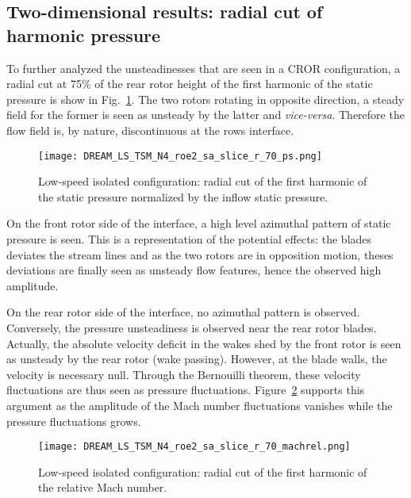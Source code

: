 \subsection{Two-dimensional results: radial cut of harmonic pressure}
\label{sub:dream_ls_hb_radial_cuts}

To further analyzed the unsteadinesses that are seen
in a CROR configuration, a radial cut at 75\% of the
rear rotor height of the first harmonic
of the static pressure is show in 
Fig.~\ref{fig:dream_ls_hb_radial_cuts}.
The two rotors rotating in opposite direction, a steady
field for the former is seen as unsteady by the latter and \emph{vice-versa}.
Therefore the flow field is, by nature, discontinuous at the rows interface.
\begin{figure}[htp]
  \centering
  \texttt{[image: DREAM\_LS\_TSM\_N4\_roe2\_sa\_slice\_r\_70\_ps.png]}
  \caption{Low-speed isolated configuration: radial cut of the first harmonic of the
  static pressure normalized by the inflow static pressure.}
  \label{fig:dream_ls_hb_radial_cuts}
\end{figure}

On the front rotor side of the interface, a high level azimuthal 
pattern of static pressure is seen. This is a representation
of the potential effects: the blades deviates the stream lines and
as the two rotors are in opposition motion, theses deviations
are finally seen as unsteady flow features, hence the observed high amplitude.

On the rear rotor side of the interface, no azimuthal pattern is observed.
Conversely, the pressure unsteadiness is observed near the rear rotor blades.
Actually, the absolute velocity deficit in the wakes shed by the front rotor
is seen as unsteady by the rear rotor (wake passing). However, at the blade walls,
the velocity is necessary null. Through the Bernouilli theorem, these 
velocity fluctuations are thus seen as pressure fluctuations. 
Figure~\ref{fig:dream_ls_hb_radial_cuts_machrel}
supports this argument as the amplitude of the Mach number fluctuations
vanishes while the pressure fluctuations grows.
\begin{figure}[htp]
  \centering
  \texttt{[image: DREAM\_LS\_TSM\_N4\_roe2\_sa\_slice\_r\_70\_machrel.png]}
  \caption{Low-speed isolated configuration: radial cut of the first harmonic of the
  relative Mach number.}
  \label{fig:dream_ls_hb_radial_cuts_machrel}
\end{figure}

